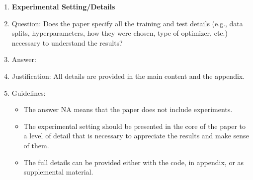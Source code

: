 \documentclass{article}
\begin{document}
\begin{enumerate}
\item {\bf Experimental Setting/Details}
    \item[] Question: Does the paper specify all the training and test details (e.g., data splits, hyperparameters, how they were chosen, type of optimizer, etc.) necessary to understand the results?
    \item[] Answer: \answerYes{} %
    \item[] Justification: All details are provided in the main content and the appendix.
    \item[] Guidelines:
    \begin{itemize}
        \item The answer NA means that the paper does not include experiments.
        \item The experimental setting should be presented in the core of the paper to a level of detail that is necessary to appreciate the results and make sense of them.
        \item The full details can be provided either with the code, in appendix, or as supplemental material.
    \end{itemize}


\end{enumerate}
\end{document}
